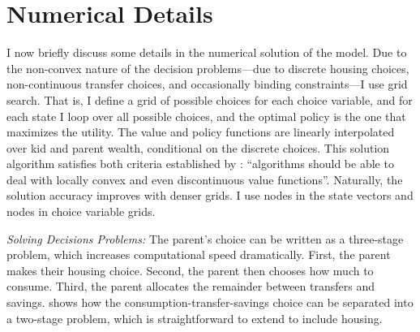 \documentclass[12pt]{article}
\begin{document}
\begin{table}
	\center 
\end{table}

\section{Numerical Details}\label{sec:computational}
I now briefly discuss some details in the numerical solution of the model. Due to the non-convex nature of the decision problems---due to discrete housing choices, non-continuous transfer choices, and occasionally binding constraints---I use grid search. That is, I define a grid of possible choices for each choice variable, and for each state I loop over all possible choices, and the optimal policy is the one that maximizes the utility. The value and policy functions are linearly interpolated over kid and parent wealth, conditional on the discrete choices. This solution algorithm satisfies both criteria established by \cite[p.30]{Barczyk2020}: ``algorithms should be able to deal with locally convex and even discontinuous value functions''. Naturally, the solution accuracy improves with denser grids. I use {\parnstate} nodes in the state vectors and {\parnchoice} nodes in choice variable grids.

\textit{Solving Decisions Problems:} 
The parent's choice can be written as a three-stage problem, which increases computational speed dramatically. First, the parent makes their housing choice. Second, the parent then chooses how much to consume. Third, the parent allocates the remainder between transfers and savings. \cite{Chu2020} shows how the consumption-transfer-savings choice can be separated into a two-stage problem, which is straightforward to extend to include housing.
\end{document}
